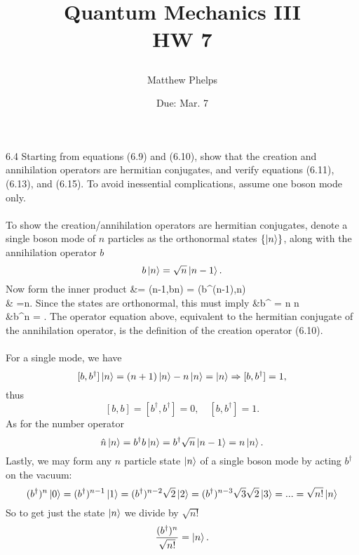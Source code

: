 \documentclass[10pt,letterpaper]{article}
\title{\begin{spacing}{1.2}Quantum Mechanics III\\HW 7\end{spacing}}
\author{Matthew Phelps}
\date{Due: Mar. 7}
\begin{document}
\maketitle

\benum
  	 \item[6.4]
	Starting from equations (6.9) and (6.10), show that the creation and annihilation operators are hermitian conjugates,
	and verify equations (6.11), (6.13), and (6.15). To avoid inessential complications, assume one boson mode only.
	\\ \\
	To show the creation/annihilation operators are hermitian conjugates, denote a single boson mode of $n$ particles as
	the orthonormal states $\{ \ket n\}$, along with the annihilation operator $b$ 
	\[
		b\ket n = \sqrt n\ket{n-1}.
	\]
	Now form the inner product
	\ba
		 &= (n-1,bn)  = (b^\dag(n-1),n)\\
		& =\sqrt n.
	\ea
	Since the states are orthonormal, this must imply
	\ba
		&b^\dag{} = \sqrt n \ket n\\
		&\Rightarrow b^\dag\ket n = .
	\ea
	The operator equation above, equivalent to the hermitian conjugate
	of the annihilation operator, is the definition of the creation operator (6.10). \\ \\
	For a single mode, we have
	\[
		[b,b^\dag]\ket n = (n+1)\ket n-n\ket n = \ket n\Rightarrow [b,b^\dag]=1,
	\]
	thus
	\[
		[b,b]=[b^\dag,b^\dag]=0,\quad [b,b^\dag] = 1.
	\]
	As for the number operator
	\[
		\hat n\ket n = b^\dag b\ket n = b^\dag \sqrt n\ket{n-1} = n\ket n.
	\]
	Lastly, we may form any $n$ particle state $\ket n$ of a single boson mode by acting $b^\dag$ on the vacuum:
	\[
		(b^\dag)^n\ket 0 = (b^\dag)^{n-1}\ket 1 = (b^\dag)^{n-2}\sqrt{2}\ket 2 = (b^\dag)^{n-3}\sqrt 3\sqrt{2}\ket 3 
		= ... = \sqrt{n!}\ket n
	\]
	So to get just the state $\ket n$ we divide by $\sqrt{n!}$
	\[
		\frac{(b^\dag)^n}{\sqrt{n!}} = \ket n.
	\]
	\pagebreak
	
\end{document}
